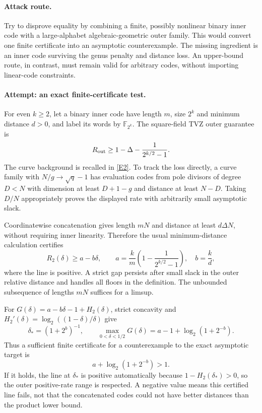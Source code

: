 \documentclass[11pt,a4paper]{article}
\newcommand{\F}{\mathbb{F}}
\newcommand{\eref}[2]{\hyperlink{extra:#1:#2}{[E#2]}}
\numberwithin{equation}{section}
\begin{document}
\paragraph{Attack route.}
Try to disprove equality by combining a finite, possibly nonlinear binary
inner code with a large-alphabet algebraic-geometric outer family. This
would convert one finite certificate into an asymptotic counterexample.
The missing ingredient is an inner code surviving the genus penalty and
distance loss. An upper-bound route, in contrast, must remain valid for
arbitrary codes, without importing linear-code constraints.

\paragraph{Attempt: an exact finite-certificate test.}
For even $k\ge2$, let a binary inner code have length $m$, size $2^k$ and
minimum distance $d>0$, and label its words by $\F_{2^k}$. The square-field
TVZ outer guarantee is
\[
 R_{\rm out}\ge1-\Delta-\frac1{2^{k/2}-1}.
\]
The curve background is recalled in \eref{30006751}{2}. To track the loss directly,
a curve family with $N/g\to\sqrt q-1$ has evaluation codes from pole
divisors of degree $D<N$ with dimension at least $D+1-g$ and distance at
least $N-D$. Taking $D/N$ appropriately proves the displayed rate with
arbitrarily small asymptotic slack.

Coordinatewise concatenation gives length $mN$ and distance at least
$d\Delta N$, without requiring inner linearity. Therefore the usual
minimum-distance calculation certifies
\begin{equation}\label{30006751:line}
 R_2(\delta)\ge a-b\delta,\qquad
 a=\frac{k}{m}\left(1-\frac1{2^{k/2}-1}\right),\quad b=\frac{k}{d},
\end{equation}
where the line is positive. A strict gap persists after small slack in the
outer relative distance and handles all floors in the definition. The
unbounded subsequence of lengths $mN$ suffices for a limsup.

For $G(\delta)=a-b\delta-1+H_2(\delta)$, strict concavity and
$H_2'(\delta)=\log_2((1-\delta)/\delta)$ give
\begin{equation}\label{30006751:test}
 \delta_*=(1+2^b)^{-1},\qquad
 \max_{0<\delta<1/2}G(\delta)=a-1+\log_2(1+2^{-b}).
\end{equation}
Thus a sufficient finite certificate for a counterexample to the exact
asymptotic target is
\[
 \boxed{a+\log_2(1+2^{-b})>1.}
\]
If it holds, the line at $\delta_*$ is positive automatically because
$1-H_2(\delta_*)>0$, so the outer positive-rate range is respected. A
negative value means this certified line fails, not that the concatenated
codes could not have better distances than the product lower bound.
\end{document}
